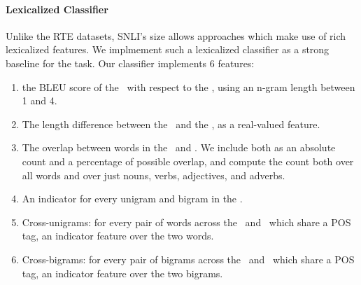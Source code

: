\paragraph{Lexicalized Classifier}
Unlike the RTE datasets, SNLI's size allows approaches which make use of
  rich lexicalized features.
We implmement such a lexicalized classifier as a strong baseline 
  for the task.
Our classifier implements 6 features:
\begin{enumerate}
\setlength\itemsep{-0.25em}
  \item the BLEU score of the \hypothesis\ with respect
  to the \premise, using an n-gram length between 1 and 4.

  \item The length difference between the \hypothesis\ and the \premise, as a real-valued
  feature.

  \item The overlap between words in the \premise\ and \hypothesis. We include
  both as an absolute count and a percentage of possible overlap, and compute
  the count both over all words and over just nouns, verbs, adjectives, 
  and adverbs.
  
  \item\label{lst:ngram} An indicator for every unigram and bigram in the \hypothesis.

  \item\label{lst:unigram} Cross-unigrams: for every pair of words across the \premise\ and \hypothesis\ which share a 
  POS tag, an indicator feature over the two words.
  
  \item\label{lst:bigram} Cross-bigrams: for every pair of bigrams across the \premise\ and \hypothesis\ which share a 
  POS tag, an indicator feature over the two bigrams.
\end{enumerate}

%
%

